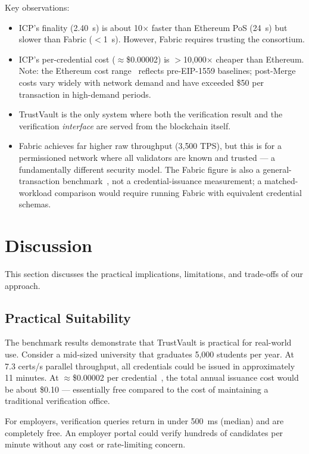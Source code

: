 \documentclass[journal]{IEEEtran}
\begin{document}
Key observations:
\begin{itemize}[leftmargin=*]
  \item ICP's finality (2.40~s) is about 10$\times$ faster than Ethereum PoS (24~s) but slower than Fabric ($<$1~s). However, Fabric requires trusting the consortium.
  \item ICP's per-credential cost ($\approx$\$0.00002) is ${>}$10{,}000$\times$ cheaper than Ethereum. Note: the Ethereum cost range~\cite{wood2014ethereum} reflects pre-EIP-1559 baselines; post-Merge costs vary widely with network demand and have exceeded \$50 per transaction in high-demand periods.
  \item TrustVault is the only system where both the verification result and the verification \emph{interface} are served from the blockchain itself.
  \item Fabric achieves far higher raw throughput (3{,}500 TPS), but this is for a permissioned network where all validators are known and trusted — a fundamentally different security model. The Fabric figure is also a general-transaction benchmark~\cite{androulaki2018fabric}, not a credential-issuance measurement; a matched-workload comparison would require running Fabric with equivalent credential schemas.
\end{itemize}

\section{Discussion}
\label{sec:discussion}

This section discusses the practical implications, limitations, and trade-offs of our approach.

\subsection{Practical Suitability}

The benchmark results demonstrate that TrustVault is practical for real-world use. Consider a mid-sized university that graduates 5,000 students per year. At 7.3 certs/s parallel throughput, all credentials could be issued in approximately 11 minutes. At $\approx$\$0.00002 per credential~\cite{dfinity2025gascost}, the total annual issuance cost would be about \$0.10 — essentially free compared to the cost of maintaining a traditional verification office.

For employers, verification queries return in under 500~ms (median) and are completely free. An employer portal could verify hundreds of candidates per minute without any cost or rate-limiting concern.
\end{document}
